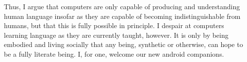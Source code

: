 \documentclass[man,floatsintext,12pt,natbib]{apa6}
\begin{document}
Thus, I argue that computers are only capable of producing and understanding
human language insofar as they are capable of becoming indistinguishable from
humans, but that this is fully possible in principle. I despair at computers
learning language as they are currently taught, however. It is only by being
embodied and living socially that any being, synthetic or otherwise, can hope
to be a fully literate being. I, for one, welcome our new android companions.

\clearpage

\end{document}
